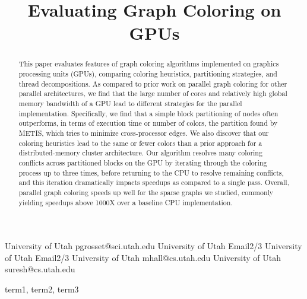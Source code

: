 \documentclass[preprint]{sigplanconf}
\begin{document}
\copyrightdata{[to be supplied]}


\title{Evaluating Graph Coloring on GPUs}

          {University of Utah}
          {pgrosset@sci.utah.edu}
          {University of Utah}
          {Email2/3}
          {University of Utah}
          {Email2/3}
          {University of Utah}
          {mhall@cs.utah.edu}
          {University of Utah}
          {suresh@cs.utah.edu}

\maketitle

\begin{abstract}
This paper evaluates features of graph coloring algorithms implemented on graphics processing units (GPUs), comparing coloring heuristics, partitioning strategies, and thread decompositions.  As compared to prior work on parallel graph coloring for other parallel architectures, we find that the large number of cores and relatively high global memory bandwidth of a GPU lead to different strategies for the parallel implementation.  Specifically, we find that a simple block partitioning of nodes often outperforms, in terms of execution time or number of colors, the partition found by METIS, which tries to minimize cross-processor edges.  We also discover that our coloring heuristics lead to the same or fewer colors than a prior approach for a distributed-memory cluster architecture.  Our algorithm resolves many coloring conflicts across partitioned blocks on the GPU by iterating through the coloring process up to three times, before returning to the CPU to resolve remaining conflicts, and this iteration dramatically impacts speedups as compared to a single pass.  Overall, parallel graph coloring speeds up well for the sparse graphs we studied, commonly yielding speedups above 1000X over a baseline CPU implementation.
\end{abstract}


\terms
term1, term2, term3
\end{document}
